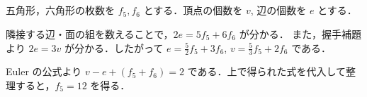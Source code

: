 \subsection{}
五角形，六角形の枚数を $f_5, f_6$ とする．頂点の個数を $v$, 辺の個数を $e$ とする．

隣接する辺・面の組を数えることで，$2e = 5f_5 + 6f_6$ が分かる．
また，握手補題より $2e = 3v$ が分かる．したがって
$e = \frac52 f_5 + 3f_6$, $v = \frac53 f_5 + 2f_6$ である．

Euler の公式より $v - e + (f_5 + f_6) = 2$ である．上で得られた式を代入して整理すると，$f_5 = 12$ を得る．


